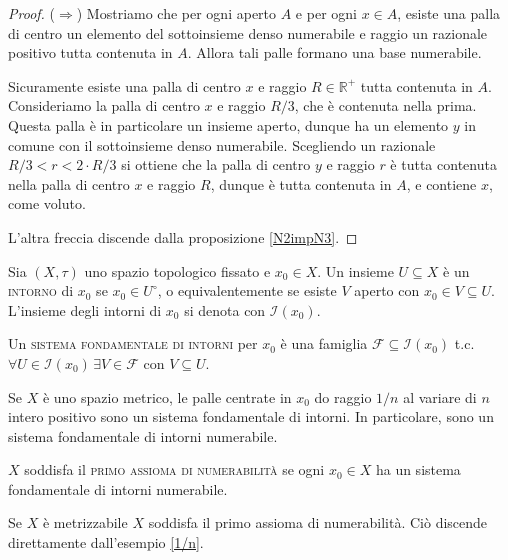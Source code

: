 \documentclass{article}
\begin{document}
\begin{proof}
	($\Rightarrow$) Mostriamo che per ogni aperto $A$ e per ogni $x \in A$,
	esiste una palla di centro un elemento del sottoinsieme denso numerabile e
	raggio un razionale positivo tutta contenuta in $A$. Allora tali palle
	formano una base numerabile.

	Sicuramente esiste una palla di centro $x$ e raggio $R \in \mathbb{R}^+$
	tutta contenuta in $A$. Consideriamo la palla di centro $x$ e raggio $R/3$,
	che è contenuta nella prima. Questa palla è in particolare un insieme
	aperto, dunque ha un elemento $y$ in comune con il sottoinsieme denso
	numerabile. Scegliendo un razionale $R/3<r<2 \cdot R/3$ si ottiene che la
	palla di centro $y$ e raggio $r$ è tutta contenuta nella palla di centro $x$
	e raggio $R$, dunque è tutta contenuta in $A$, e contiene $x$, come voluto.

	L'altra freccia discende dalla proposizione \ref{N2impN3}.
\end{proof}

\begin{defn}
	Sia $(X, \tau)$ uno spazio topologico fissato e $x_0 \in X$. Un insieme $U
	\subseteq X$ è un \textsc{intorno} di $x_0$ se $x_0 \in
	U^{\circ}$, o equivalentemente se esiste $V$ aperto con $x_0 \in V
	\subseteq U$. L'insieme degli intorni di $x_0$ si denota con
	$\mathcal{I}(x_0)$.
\end{defn}

\begin{defn}
	Un \textsc{sistema fondamentale di intorni} per $x_0$ è una famiglia
	$\mathcal{F} \subseteq \mathcal{I}(x_0)$ t.c. $\forall U \in
	\mathcal{I}(x_0) \, \exists V \in \mathcal{F}$ con $V \subseteq U$.
\end{defn}

\begin{ex} \label{1/n}
	Se $X$ è uno spazio metrico, le palle centrate in $x_0$ do raggio $1/n$ al
	variare di $n$ intero positivo sono un sistema fondamentale di intorni. In
	particolare, sono un sistema fondamentale di intorni numerabile.
\end{ex}

\begin{defn} \label{N1}
	$X$ soddisfa il \textsc{primo assioma di numerabilità} se ogni $x_0 \in X$
	ha un sistema fondamentale di intorni numerabile.
\end{defn}

\begin{ftt}
	Se $X$ è metrizzabile $X$ soddisfa il primo assioma di numerabilità. Ciò
	discende direttamente dall'esempio \ref{1/n}.
\end{ftt}
\end{document}
